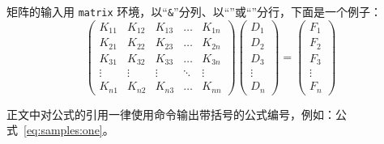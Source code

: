 矩阵的输入用 \texttt{matrix} 环境，以“\texttt{\&}”分列、以“\ltxcmdname{\textbackslash}”或“”分行，下面是一个例子：
\begin{equation}
\left(
  \begin{matrix}
    K_{11} &K_{12} &K_{13} &\ldots &K_{1n}\\
    K_{21} &K_{22} &K_{23} &\ldots &K_{2n}\\
    K_{31} &K_{32} &K_{33} &\ldots &K_{3n}\\
    \vdots &\vdots &\vdots &\ddots &\vdots\\
    K_{n1} &K_{n2} &K_{n3} &\ldots &K_{nn}
  \end{matrix}
\right) \left(
  \begin{matrix}
     D_{1}\\ D_{2}\\ D_{3}\\ \vdots\\ D_{n}
  \end{matrix}
\right) = \left(
  \begin{matrix}
    F_{1}\\ F_{2}\\ F_{3}\\ \vdots\\ F_{n}
  \end{matrix}
\right)
\end{equation}

正文中对公式的引用一律使用命令输出带括号的公式编号，例如：公式~\eqref{eq:samples:one}。

